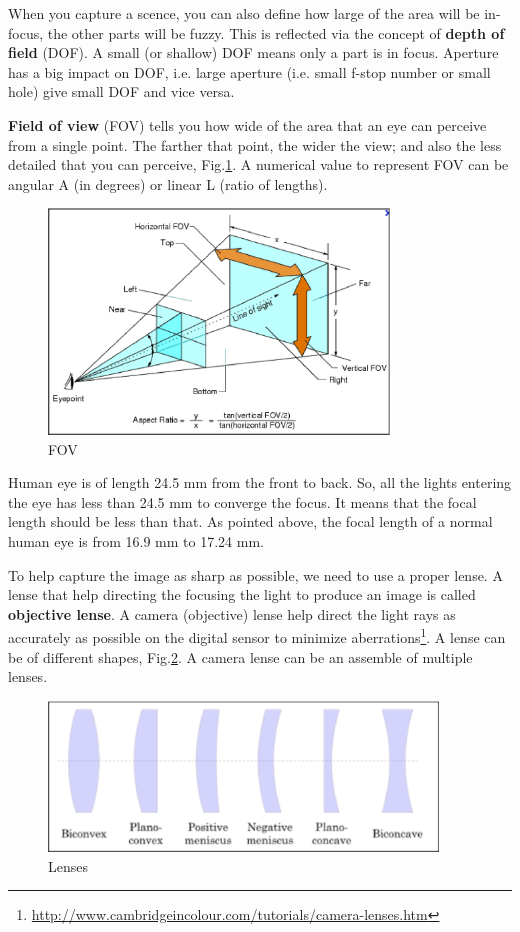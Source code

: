 When you capture a scence, you can also define how large of the area will be
in-focus, the other parts will be fuzzy. This is reflected via the concept of
{\bf depth of field} (DOF). A small (or shallow) DOF means only a part is in
focus. Aperture has a big impact on DOF, i.e. large aperture (i.e. small
f-stop number or small hole) give small DOF and vice versa. 

{\bf Field of view} (FOV) tells you how wide of the area that an eye can
perceive from a single point. The farther that point, the wider the view; and
also the less detailed that you can perceive, Fig.\ref{fig:FOV}. A numerical
value to represent FOV can be angular A (in degrees) or linear L (ratio of
lengths).

\begin{figure}[hbt]
  \centerline{\includegraphics[height=6cm,
    angle=0]{./images/field_of_view.eps}}    
\caption{FOV}
\label{fig:FOV}
\end{figure}

Human eye is of length 24.5 mm from the front to back. So, all the lights
entering the eye has less than 24.5 mm to converge the focus. It means that the
focal length should be less than that. As pointed above, the focal length of a
normal human eye is from 16.9 mm to 17.24 mm. 

To help capture the image as sharp as possible, we need to use a proper lense. A
lense that help directing the focusing the light to produce an image is called
{\bf objective lense}. A camera (objective) lense help direct the light rays as
accurately as possible on the digital sensor
to
minimize
aberrations\footnote{\url{http://www.cambridgeincolour.com/tutorials/camera-lenses.htm}}.
A lense can be of different shapes, Fig.\ref{fig:lense_shape}. A camera lense
can be an assemble of multiple lenses. 

\begin{figure}[hbt]
  \centerline{\includegraphics[height=4cm,
    angle=0]{./images/lense_shapes.eps}}    
\caption{Lenses}
\label{fig:lense_shape}
\end{figure}

